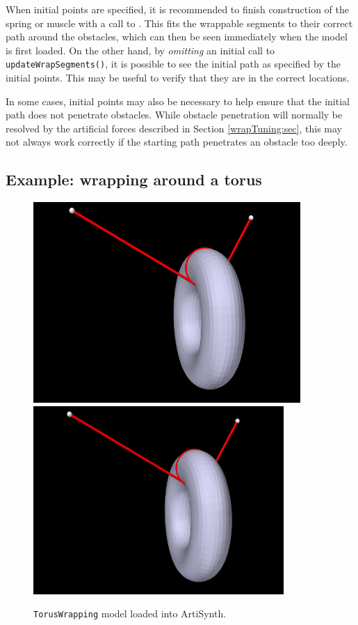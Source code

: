 \begin{sideblock}
When initial points are specified, it is recommended to finish
construction of the spring or muscle with a call to
.  This fits
the wrappable segments to their correct path around the obstacles,
which can then be seen immediately when the model is first loaded. On
the other hand, by {\it omitting} an initial call to {\tt
updateWrapSegments()}, it is possible to see the initial path as
specified by the initial points. This may be useful to
verify that they are in the correct locations.
\end{sideblock}

\begin{sideblock}
In some cases, initial points may also be necessary to help ensure
that the initial path does not penetrate obstacles. While obstacle
penetration will normally be resolved by the artificial forces
described in Section \ref{wrapTuning:sec}, this may not always work
correctly if the starting path penetrates an obstacle too deeply.
\end{sideblock}

\subsection{Example: wrapping around a torus}
\label{TorusWrapping:sec}

\begin{figure}[ht]
\begin{center}
\iflatexml
 \includegraphics[]{images/TorusWrapping}
\else
 \includegraphics[width=3.75in]{images/TorusWrapping}
\fi
\end{center}
\caption{{\tt TorusWrapping} model loaded into ArtiSynth.}
\label{TorusWrapping:fig}
\end{figure}

